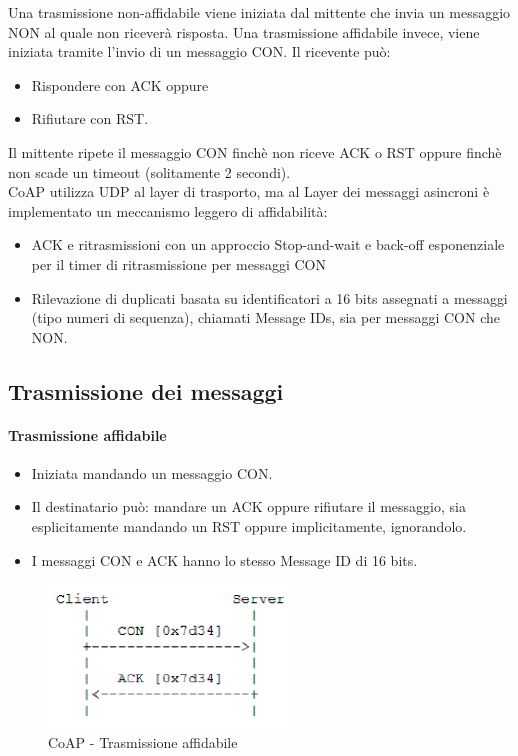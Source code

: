 \documentclass{article}
\begin{document}
Una trasmissione non-affidabile viene iniziata dal mittente che invia un messaggio NON al quale non riceverà risposta. Una trasmissione affidabile invece, viene iniziata tramite l'invio di un messaggio CON. Il ricevente può:
\begin{itemize}
    \item Rispondere con ACK oppure
    \item Rifiutare con RST.
\end{itemize}
Il mittente ripete il messaggio CON finchè non riceve ACK o RST oppure finchè non scade un timeout (solitamente 2 secondi). \\ CoAP utilizza UDP al layer di trasporto, ma al Layer dei messaggi asincroni è implementato un meccanismo leggero di affidabilità:
\begin{itemize}
    \item ACK e ritrasmissioni con un approccio Stop-and-wait e back-off esponenziale per il timer di ritrasmissione per messaggi CON
    \item Rilevazione di duplicati basata su identificatori a 16 bits assegnati a messaggi (tipo numeri di sequenza), chiamati Message IDs, sia per messaggi CON che NON.
\end{itemize}

\subsection{Trasmissione dei messaggi}
\paragraph{Trasmissione affidabile} 
\begin{itemize}
    \item Iniziata mandando un messaggio CON.
    \item Il destinatario può: mandare un ACK oppure rifiutare il messaggio, sia esplicitamente mandando un RST oppure implicitamente, ignorandolo.
    \item I messaggi CON e ACK hanno lo stesso Message ID di 16 bits.
\end{itemize}
\begin{figure}[H]
\centering
\includegraphics[scale=0.6]{figures/coap trasmissione affidabile.png}
\caption{CoAP - Trasmissione affidabile}
\end{figure}
\end{document}
